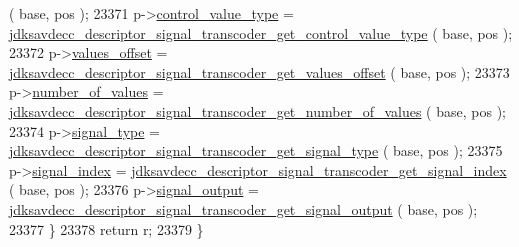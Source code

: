 \begin{DoxyCode}
      ( base, pos );
23371         p->\hyperlink{structjdksavdecc__descriptor__signal__transcoder_a62a5b88a920cc4d09508de6fc60d9a63}{control\_value\_type} = 
      \hyperlink{group__descriptor__transcoder_ga0d02cb0435a77412f0d67f45ae21a534}{jdksavdecc\_descriptor\_signal\_transcoder\_get\_control\_value\_type}
      ( base, pos );
23372         p->\hyperlink{structjdksavdecc__descriptor__signal__transcoder_a2987071ee0b81f35817e48a0dc92ad76}{values\_offset} = 
      \hyperlink{group__descriptor__transcoder_gae992b3b6e7368beec8dd0e23aff64d1f}{jdksavdecc\_descriptor\_signal\_transcoder\_get\_values\_offset}
      ( base, pos );
23373         p->\hyperlink{structjdksavdecc__descriptor__signal__transcoder_a1c32421ead62b8a032c4346688cd9b69}{number\_of\_values} = 
      \hyperlink{group__descriptor__transcoder_ga57f0e1c8f9e771dd5cc99ee660abf670}{jdksavdecc\_descriptor\_signal\_transcoder\_get\_number\_of\_values}
      ( base, pos );
23374         p->\hyperlink{structjdksavdecc__descriptor__signal__transcoder_a248e60ef99d5ed1779989d1dd6b6dc5a}{signal\_type} = 
      \hyperlink{group__descriptor__transcoder_ga359342278faa6eb536dae43591fe9d27}{jdksavdecc\_descriptor\_signal\_transcoder\_get\_signal\_type}
      ( base, pos );
23375         p->\hyperlink{structjdksavdecc__descriptor__signal__transcoder_ae2e81a95ee9ad83f1fe22b6a1ee29075}{signal\_index} = 
      \hyperlink{group__descriptor__transcoder_ga505f5283e70c9d181e14cff0a1b18c6d}{jdksavdecc\_descriptor\_signal\_transcoder\_get\_signal\_index}
      ( base, pos );
23376         p->\hyperlink{structjdksavdecc__descriptor__signal__transcoder_ab4b91864e6fc335d7e86536d9f4461e4}{signal\_output} = 
      \hyperlink{group__descriptor__transcoder_ga0f09af6fb05518183a3152970f1a6496}{jdksavdecc\_descriptor\_signal\_transcoder\_get\_signal\_output}
      ( base, pos );
23377     \}
23378     \textcolor{keywordflow}{return} r;
23379 \}
\end{DoxyCode}


